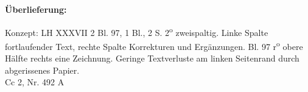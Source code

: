       
               
                \begin{ledgroupsized}[r]{120mm}
                \footnotesize 
                \pstart                
                \noindent\textbf{\"{U}berlieferung:}   
                \pend
                \end{ledgroupsized}
            
              
                            \begin{ledgroupsized}[r]{114mm}
                            \footnotesize 
                            \pstart \parindent -6mm
                            Konzept: LH XXXVII 2 Bl. 97, 1 Bl., 2 S. 2\textsuperscript{o} zweispaltig. Linke Spalte fortlaufender Text, rechte Spalte Korrekturen und Erg\"{a}nzungen. Bl. 97 r\textsuperscript{o} obere H\"{a}lfte rechts eine Zeichnung. Geringe Textverluste am linken Seitenrand durch abgerissenes Papier.\\Cc 2, Nr. 492 A \pend
                            \end{ledgroupsized}
                \vspace*{8mm}
                \pstart 
                \normalsize
